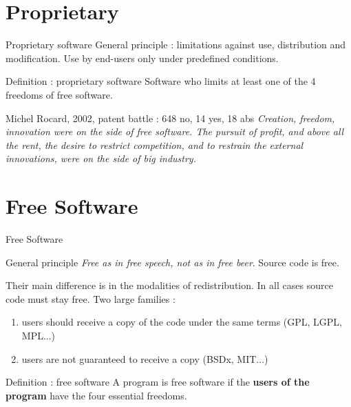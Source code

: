 \documentclass{beamer}
\begin{document}

\section{Proprietary}

\begin{frame}{Proprietary software}
  General principle : limitations against use, distribution and
  modification. Use by end-users only under predefined conditions.

  \begin{alertblock}{Definition : proprietary software}
    Software who limits at least one of the 4 freedoms of free
    software.
  \end{alertblock}

  \pause

  \begin{block}{Michel Rocard, 2002, patent battle : 648 no, 14 yes,
      18 abs}
    \textit{Creation, freedom, innovation were on the side of free
      software. The pursuit of profit, and above all the rent, the
      desire to restrict competition, and to restrain the external
      innovations, were on the side of big industry.}
  \end{block}
\end{frame}


\section{Free Software}


\begin{frame}{Free Software}

  \begin{alertblock}{General principle}
    \textit{Free as in free speech, not as in free beer}. Source code
    is free.
  \end{alertblock}

  Their main difference is in the modalities of redistribution. In all
  cases source code must stay free. Two large families :

  \begin{enumerate}
  \item users should receive a copy of the code under the same terms
    (GPL, LGPL, MPL...)
  \item users are not guaranteed to receive a copy (BSDx, MIT...)
  \end{enumerate}

  \begin{alertblock}{Definition : free software}
    A program is free software if the \textbf{users of the program} have
    the four essential freedoms.
  \end{alertblock}
  
\end{frame}
\end{document}
